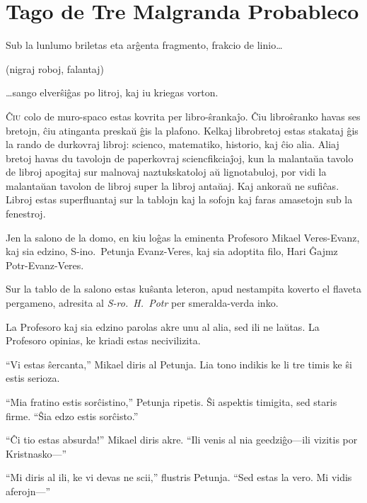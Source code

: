 \chapter{Tago de Tre Malgranda Probableco}

\begin{chapterOpeningQuote}
\noindent
Sub la lunlumo briletas eta arĝenta fragmento, frakcio de linio…

\vspace*{2ex}
(nigraj roboj, falantaj)

\vspace*{2ex}
…sango elverŝiĝas po litroj, kaj iu kriegas vorton.
\end{chapterOpeningQuote}

\lettrine{Ĉ}{iu} colo de muro-spaco estas kovrita per libro-ŝrankaĵo.
Ĉiu libroŝranko havas ses bretojn, ĉiu atinganta preskaŭ ĝis la plafono.
Kelkaj librobretoj estas stakataj ĝis la rando de durkovraj libroj: scienco, matematiko, historio, kaj ĉio alia.
Aliaj bretoj havas du tavolojn de paperkovraj sciencfikciaĵoj, kun la malantaŭa tavolo de libroj apogitaj sur malnovaj naztukskatoloj aŭ lignotabuloj, por vidi la malantaŭan tavolon de libroj super la libroj antaŭaj.
Kaj ankoraŭ ne sufiĉas.
Libroj estas superfluantaj sur la tablojn kaj la sofojn kaj faras amasetojn sub la fenestroj.

Jen la salono de la domo, en kiu loĝas la eminenta Profesoro Mikael Veres\nobreakdash-Evanz, kaj sia edzino, S\nobreakdash-ino.~Petunja Evanz\nobreakdash-Veres, kaj sia adoptita filo, Hari Ĝajmz Potr\nobreakdash-Evanz\nobreakdash-Veres.

Sur la tablo de la salono estas kuŝanta leteron, apud nestampita koverto el flaveta pergameno, adresita al \emph{S\nobreakdash-ro.~H.~Potr} per smeralda-verda inko.

La Profesoro kaj sia edzino parolas akre unu al alia, sed ili ne laŭtas.
La Profesoro opinias, ke kriadi estas necivilizita.

“Vi estas ŝercanta,” Mikael diris al Petunja.
Lia tono indikis ke li tre timis ke ŝi estis serioza.

“Mia fratino estis sorĉistino,” Petunja ripetis.
Ŝi aspektis timigita, sed staris firme.
“Ŝia edzo estis sorĉisto.”

“Ĉi tio estas absurda!” Mikael diris akre.
“Ili venis al nia geedziĝo—ili vizitis por Kristnasko—”

“Mi diris al ili, ke vi devas ne scii,” flustris Petunja.
“Sed estas la vero. Mi vidis aferojn—”

